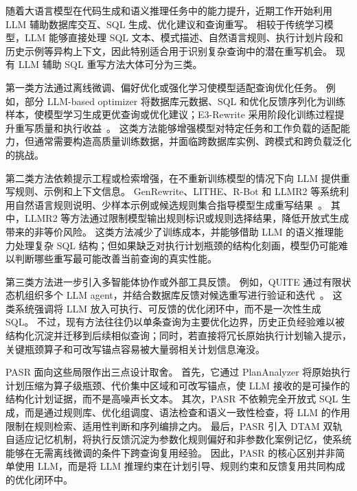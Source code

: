 随着大语言模型在代码生成和语义推理任务中的能力提升，近期工作开始利用 LLM 辅助数据库交互、SQL 生成、优化建议和查询重写。
相较于传统学习模型，LLM 能够直接处理 SQL 文本、模式描述、自然语言规则、执行计划片段和历史示例等异构上下文，因此特别适合用于识别复杂查询中的潜在重写机会。
现有 LLM 辅助 SQL 重写方法大体可分为三类。

第一类方法通过离线微调、偏好优化或强化学习使模型适配查询优化任务。
例如，部分 LLM-based optimizer 将数据库元数据、SQL 和优化反馈序列化为训练样本，使模型学习生成更优查询或优化建议；E3-Rewrite 采用阶段化训练过程提升重写质量和执行收益~\cite{xu2025e3rewrite}。
这类方法能够增强模型对特定任务和工作负载的适配能力，但通常需要构造高质量训练数据，并面临跨数据库实例、跨模式和跨负载泛化的挑战。

第二类方法依赖提示工程或检索增强，在不重新训练模型的情况下向 LLM 提供重写规则、示例和上下文信息。
GenRewrite、LITHE、R-Bot 和 LLMR2 等系统利用自然语言规则说明、少样本示例或候选规则集合指导模型生成重写结果~\cite{sun2025rbot,dharwada2025lithe,li2024llmr2,liu2024genrewrite}。
其中，LLMR2 等方法通过限制模型输出规则标识或规则选择结果，降低开放式生成带来的非等价风险。
这类方法减少了训练成本，并能够借助 LLM 的语义推理能力处理复杂 SQL 结构；但如果缺乏对执行计划瓶颈的结构化刻画，模型仍可能难以判断哪些重写最可能改善当前查询的真实性能。

第三类方法进一步引入多智能体协作或外部工具反馈。
例如，QUITE 通过有限状态机组织多个 LLM agent，并结合数据库反馈对候选重写进行验证和迭代~\cite{song2025quite}。
这类系统强调将 LLM 放入可执行、可反馈的优化闭环中，而不是一次性生成 SQL。
不过，现有方法往往仍以单条查询为主要优化边界，历史正负经验难以被结构化沉淀并迁移到后续相似查询；同时，若直接将冗长原始执行计划输入提示，关键瓶颈算子和可改写锚点容易被大量弱相关计划信息淹没。

PASR 面向这些局限作出三点设计取舍。
首先，它通过 PlanAnalyzer 将原始执行计划压缩为算子级瓶颈、代价集中区域和可改写锚点，使 LLM 接收的是可操作的结构化计划证据，而不是高噪声长文本。
其次，PASR 不依赖完全开放式 SQL 生成，而是通过规则库、优化组调度、语法检查和语义一致性检查，将 LLM 的作用限制在规则检索、适用性判断和序列编排之内。
最后，PASR 引入 DTAM 双轨自适应记忆机制，将执行反馈沉淀为参数化规则偏好和非参数化案例记忆，使系统能够在无需离线微调的条件下跨查询复用经验。
因此，PASR 的核心区别并非简单使用 LLM，而是将 LLM 推理约束在计划引导、规则约束和反馈复用共同构成的优化闭环中。
